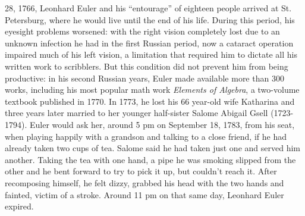 28, 1766, Leonhard Euler and his ``entourage'' of eighteen people arrived at St. Petersburg, where he would live until the end of his life. During this period, his eyesight problems worsened: with the right vision completely lost due to an unknown infection he had in the first Russian period, now a cataract operation impaired much of his left vision, a limitation that required him to dictate all his written work to scribblers. But this condition did not prevent him from being productive: in his second Russian years, Euler made available more than 300 works, including his most popular math work \emph{Elements of Algebra}, a two-volume textbook published in 1770. In 1773, he lost his 66 year-old wife Katharina and three years later married to her younger half-sister Salome Abigail Gsell (1723-1794). Euler would ask her, around 5 pm on September 18, 1783, from his seat, when playing happily with a grandson and talking to a close friend, if he had already taken two cups of tea. Salome said he had taken just one and served him another. Taking the tea with one hand, a pipe he was smoking slipped from the other and he bent forward to try to pick it up, but couldn't reach it. After recomposing himself, he felt dizzy, grabbed his head with the two hands and fainted, victim of a stroke. Around 11 pm on that same day, Leonhard Euler expired.  
\begin{figure}[!ht]
	\centering
	\begin{center}
	\end{center}
	\label{fg:eulerPortrai}
\end{figure}  


